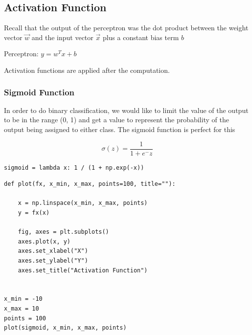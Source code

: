 \documentclass[openany]{book}
\begin{document}
    \subsection{Activation Function}\label{activation-function}

Recall that the output of the perceptron was the dot product between the
weight vector \(\vec{w}\) and the input vector \(\vec{x}\) plus a
constant bias term \(b\)

Perceptron: \(y=w^Tx + b\)

Activation functions are applied after the computation.

    \subsubsection{Sigmoid Function}\label{sigmoid-function}

In order to do binary classification, we would like to limit the value
of the output to be in the range (0, 1) and get a value to represent the
probability of the output being assigned to either class. The sigmoid
function is perfect for this

\[ \sigma(z) = \frac{1}{1+e^-z} \]

\begin{tcolorbox}
\tiny
\begin{verbatim}
sigmoid = lambda x: 1 / (1 + np.exp(-x))
\end{verbatim}
\end{tcolorbox}

\begin{tcolorbox}
\tiny
\begin{verbatim}
def plot(fx, x_min, x_max, points=100, title=""):

    x = np.linspace(x_min, x_max, points)
    y = fx(x)

    fig, axes = plt.subplots()
    axes.plot(x, y)
    axes.set_xlabel("X")
    axes.set_ylabel("Y")
    axes.set_title("Activation Function")


x_min = -10
x_max = 10
points = 100
plot(sigmoid, x_min, x_max, points)
\end{verbatim}
\end{tcolorbox}
\end{document}
